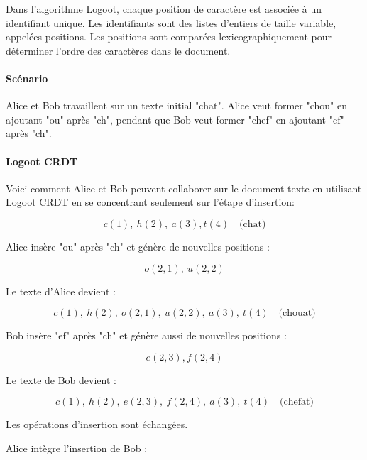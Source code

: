 Dans l'algorithme Logoot, chaque position de caractère est associée à un identifiant unique. Les identifiants sont des listes d'entiers de taille variable, appelées positions. Les positions sont comparées lexicographiquement pour déterminer l'ordre des caractères dans le document.

\paragraph{Scénario}
Alice et Bob travaillent sur un texte initial "chat". Alice veut former "chou" en ajoutant "ou" après "ch", pendant que Bob veut former "chef" en ajoutant "ef" après "ch".

\paragraph{Logoot CRDT}
Voici comment Alice et Bob peuvent collaborer sur le document texte en utilisant Logoot CRDT en se concentrant seulement sur l'étape d'insertion:

\begin{equation}
    c(1),\ h(2), \ a(3), t(4) \quad \text{(chat)}
\end{equation}

Alice insère "ou" après "ch" et génère de nouvelles positions :

\begin{equation}
    o(2, 1), \ u(2, 2)
\end{equation}

Le texte d'Alice devient :

\begin{equation}
    c(1), \ h(2), \ o(2, 1), \ u(2, 2), \ a(3), \ t(4) \quad \text{(chouat)}
\end{equation}

Bob insère "ef" après "ch" et génère aussi de nouvelles positions :

\begin{equation}
    e(2, 3), f(2, 4)
\end{equation}

Le texte de Bob devient :

\begin{equation}
    c(1), \ h(2), \ e(2, 3), \ f(2, 4), \ a(3), \ t(4) \quad \text{(chefat)}
\end{equation}

Les opérations d'insertion sont échangées.

Alice intègre l'insertion de Bob :

